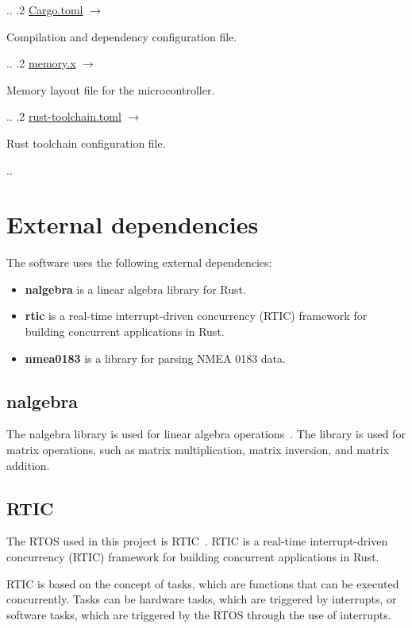 {\begin{minipage}[t]{7cm}
    \end{minipage}..
    .2 \href{https://github.com/JensMoeslund/gps-miniprojekt/blob/master/Cargo.toml}{Cargo.toml} $\longrightarrow$
    \begin{minipage}[t]{7cm}
        Compilation and dependency configuration file{.}
    \end{minipage}..
    .2 \href{https://github.com/JensMoeslund/gps-miniprojekt/blob/master/memory.x}{memory.x} $\longrightarrow$
    \begin{minipage}[t]{7cm}
        Memory layout file for the microcontroller{.}
    \end{minipage}..
    .2 \href{https://github.com/JensMoeslund/gps-miniprojekt/blob/master/rust-toolchain.toml}{rust-toolchain.toml} $\longrightarrow$
    \begin{minipage}[t]{7cm}
        Rust toolchain configuration file{.}
    \end{minipage}..
}

\section{External dependencies}\label{sec:external-dependencies}
The software uses the following external dependencies:
\begin{itemize}
    \item \textbf{nalgebra} is a linear algebra library for Rust.
    \item \textbf{rtic} is a real-time interrupt-driven concurrency (RTIC) framework for building concurrent applications in Rust.
    \item \textbf{nmea0183} is a library for parsing NMEA 0183 data.
\end{itemize}
\subsection{nalgebra}
The nalgebra library is used for linear algebra operations~\cite{nalgebra}.
The library is used for matrix operations, such as matrix multiplication, matrix inversion, and matrix addition.

\subsection{RTIC}
The RTOS used in this project is RTIC~\cite{rtic}.
RTIC is a real-time interrupt-driven concurrency (RTIC) framework for building concurrent applications in Rust.

RTIC is based on the concept of tasks, which are functions that can be executed concurrently.
Tasks can be hardware tasks, which are triggered by interrupts, or software tasks, which are triggered by the RTOS through the use of interrupts.

